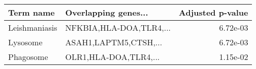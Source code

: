 \begin{tabular}{llr}
\toprule
    Term name &    Overlapping genes... &  Adjusted p-value \\
\midrule
Leishmaniasis & NFKBIA,HLA-DOA,TLR4,... &          6.72e-03 \\
     Lysosome &   ASAH1,LAPTM5,CTSH,... &          6.72e-03 \\
    Phagosome &   OLR1,HLA-DOA,TLR4,... &          1.15e-02 \\
\bottomrule
\end{tabular}
